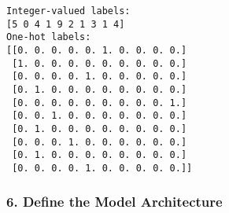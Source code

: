 \documentclass[11pt]{article}
\begin{document}
    \begin{Verbatim}[commandchars=\\\{\}]
Integer-valued labels:
[5 0 4 1 9 2 1 3 1 4]
One-hot labels:
[[0. 0. 0. 0. 0. 1. 0. 0. 0. 0.]
 [1. 0. 0. 0. 0. 0. 0. 0. 0. 0.]
 [0. 0. 0. 0. 1. 0. 0. 0. 0. 0.]
 [0. 1. 0. 0. 0. 0. 0. 0. 0. 0.]
 [0. 0. 0. 0. 0. 0. 0. 0. 0. 1.]
 [0. 0. 1. 0. 0. 0. 0. 0. 0. 0.]
 [0. 1. 0. 0. 0. 0. 0. 0. 0. 0.]
 [0. 0. 0. 1. 0. 0. 0. 0. 0. 0.]
 [0. 1. 0. 0. 0. 0. 0. 0. 0. 0.]
 [0. 0. 0. 0. 1. 0. 0. 0. 0. 0.]]

    \end{Verbatim}

    \subsubsection{6. Define the Model
Architecture}\label{define-the-model-architecture}
\end{document}
